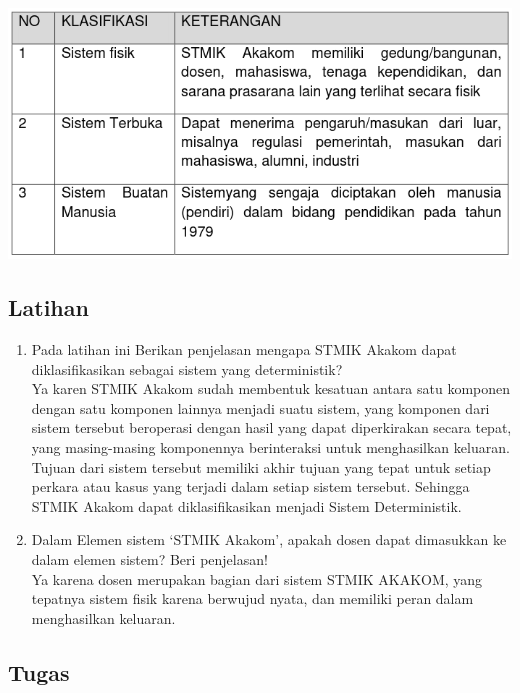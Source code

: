 \documentclass[a4paper,12pt]{article}
\begin{document}
\begin{center}
    \includegraphics[width=\textwidth]{tbl2}
\end{center}

\newpage
\subsection{Latihan}
\begin{enumerate}
   \item Pada latihan ini Berikan penjelasan mengapa STMIK Akakom dapat diklasifikasikan sebagai sistem yang
       deterministik?\\
        Ya karen STMIK Akakom sudah membentuk kesatuan antara satu komponen dengan satu komponen lainnya menjadi suatu
        sistem, yang komponen dari sistem tersebut beroperasi dengan hasil yang dapat diperkirakan
        secara tepat, yang masing-masing komponennya berinteraksi untuk menghasilkan keluaran. Tujuan dari sistem
        tersebut memiliki akhir tujuan yang tepat untuk setiap perkara atau kasus yang terjadi dalam setiap sistem
        tersebut. Sehingga STMIK Akakom dapat diklasifikasikan menjadi Sistem Deterministik.
    \item Dalam Elemen sistem ‘STMIK Akakom’, apakah dosen dapat dimasukkan ke dalam elemen sistem? Beri penjelasan!\\
        Ya karena dosen merupakan bagian dari sistem STMIK AKAKOM, yang tepatnya sistem fisik karena berwujud nyata, dan
        memiliki peran dalam menghasilkan keluaran.
\end{enumerate}

\newpage
\subsection{Tugas}
\end{document}
